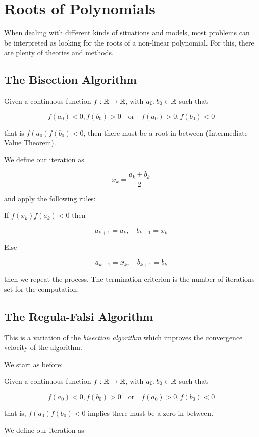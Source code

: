  
\section{Roots of Polynomials}

When dealing with different kinds of situations and models, most problems can be interpreted as looking for the 
roots of a non-linear polynomial. For this, there are plenty of theories and methods.


\subsection{The Bisection Algorithm}

Given a continuous function \(f: \mathbb{R} \to \mathbb{R}\), with \(a_0, b_0 \in \mathbb{R}\) such that 

\[
    f(a_0) < 0, f(b_0) > 0 \quad \text{or} \quad f(a_0) > 0, f(b_0) < 0
\]

that is \(f(a_0) f(b_0) < 0\), then there must be a root in between (Intermediate Value Theorem).

We define our iteration as

\[
    x_k = \frac{a_k + b_k}{2}
\]

and apply the following rules:

If \(f(x_k) f(a_k) < 0\) then 

\[
    a_{k + 1} = a_{k}, \quad b_{k + 1} = x_k
\]

Else

\[
    a_{k + 1} = x_k, \quad b_{k + 1} = b_k
\]

then we repeat the process. The termination criterion is the number of iterations set for the computation.

\subsection{The Regula-Falsi Algorithm}

This is a variation of the \emph{bisection algorithm} which improves the convergence velocity of the 
algorithm. 

We start as before: 

Given a continuous function \(f: \mathbb{R} \to \mathbb{R}\), with \(a_0, b_0 \in \mathbb{R}\) such that 

\[
    f(a_0) < 0, f(b_0) > 0 \quad \text{or} \quad f(a_0) > 0, f(b_0) < 0
\]

that is, \(f(a_0) f(b_0) < 0\) implies there must be a zero in between.

We define our iteration as

